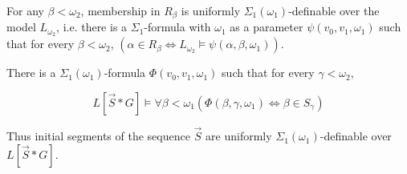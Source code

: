 \documentclass[10pt,a4paper]{amsart}
\begin{document}
\begin{lemma}\label{computationofRbetas}
For any $\beta < \omega_2$, membership in $R_{\beta}$ is uniformly $\Sigma_1(\omega_1)$-definable over the model $L_{\omega_2}$, i.e. there is a $\Sigma_1$-formula with $\omega_1$ as a parameter $\psi(v_0,v_1, \omega_1)$ such that for every $\beta < \omega_2$,
$(\alpha \in R_{\beta} \Leftrightarrow L_{\omega_2} \models \psi(\alpha, \beta,\omega_1))$. 
\end{lemma}

\begin{lemma}\label{definabilityofvecS}
There is a $\Sigma_1(\omega_1)$-formula $\Phi(v_0,v_1,\omega_1)$ {such that for every} $\gamma < \omega_2$,

\[ L[\vec{S} \ast G] \models \forall \beta < \omega_1 (\Phi (\beta, \gamma,\omega_1) \Leftrightarrow \beta \in S_{\gamma}) \]
 
Thus initial segments  of the sequence $\vec{S} $ are uniformly  $\Sigma_1(\omega_1)$-definable over $L[\vec{S} \ast G]$.
\end{lemma}
\end{document}
